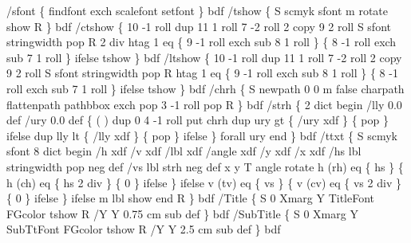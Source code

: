 \documentclass[11pt]{article}
\def\nwendcode{\endtrivlist \endgroup} %
\let\nwdocspar=\par                    %
\begin{document}
\nwenddocs{}\endmoddef
%
/sfont \{ findfont exch scalefont setfont \} bdf
/tshow \{ S scmyk sfont m rotate show R \} bdf
/ctshow \{
  10 -1 roll dup 11 1 roll 7 -2 roll 2 copy 9 2 roll 
  S sfont stringwidth pop R 2 div 
  htag 1 eq \{
    9 -1 roll exch sub 8 1 roll
    \} \{
      8 -1 roll exch sub 7 1 roll
    \} ifelse
  tshow
  \} bdf
/ltshow \{
  10 -1 roll dup 11 1 roll 7 -2 roll 2 copy 9 2 roll 
  S sfont stringwidth pop R 
  htag 1 eq \{
    9 -1 roll exch sub 8 1 roll
    \} \{
      8 -1 roll exch sub 7 1 roll
    \} ifelse
  tshow
  \} bdf
%
/chrh \{ 
  S newpath 0 0 m false 
  charpath flattenpath pathbbox exch pop
  3 -1 roll pop R
  \} bdf
/strh \{
  2 dict begin /lly 0.0 def /ury 0.0 def 
  \{ ( ) dup 0 4 -1 roll put chrh 
    dup ury gt \{ /ury xdf \} \{ pop \} ifelse
    dup lly lt \{ /lly xdf \} \{ pop \} ifelse
    \} forall
  ury end
  \} bdf
/ttxt \{
  S scmyk sfont 8 dict begin 
  /h xdf /v xdf /lbl xdf /angle xdf /y xdf /x xdf 
  /hs lbl stringwidth pop neg def /vs lbl strh neg def
  x y T angle rotate
  h (rh) eq \{ hs
    \} \{
      h (ch) eq \{ hs 2 div \} \{ 0 \} ifelse
    \} ifelse
  v (tv) eq \{ vs
    \} \{
      v (cv) eq \{ vs 2 div \} \{ 0 \} ifelse
    \} ifelse
  m lbl show end R
  \} bdf
%
/Title \{ S 0 Xmarg Y TitleFont FGcolor tshow R /Y Y 0.75 cm sub def \} bdf 
/SubTitle \{ S 0 Xmarg Y SubTtFont FGcolor tshow R /Y Y 2.5 cm sub def \} bdf 
%
%
\nwendcode{}\nwdocspar

\end{document}
